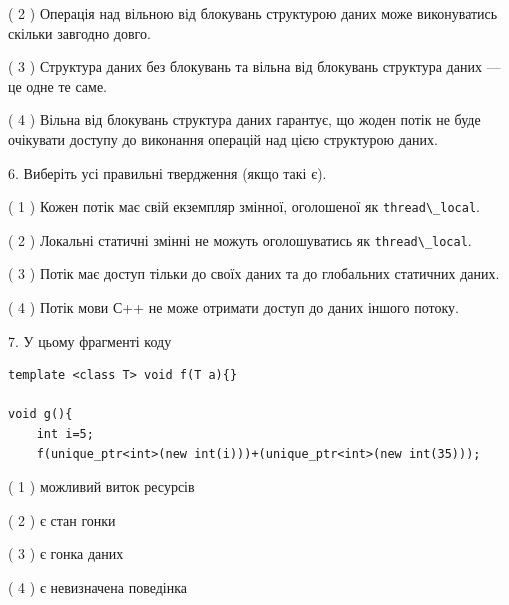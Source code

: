 \documentclass[12pt, ukrainian]{article}
\def\code#1{\Verb!#1!}
\begin{document}
\begin {large}
{( 2 ) Операція над вільною від блокувань структурою даних може виконуватись скільки завгодно довго.%

( 3 ) Структура даних без блокувань та вільна від блокувань структура даних --- це одне те саме.%

( 4 ) Вільна від блокувань структура даних гарантує, що жоден потік не буде очікувати доступу до виконання операцій над цією структурою даних.%
\newpage



\vspace{5mm}
6. Виберіть усі правильні твердження (якщо такі є).\par
\vspace{2mm}

( 1 ) Кожен потік має свій екземпляр змінної, оголошеної як \code{thread\_local}.%

( 2 ) Локальні статичні змінні не можуть оголошуватись як \code{thread\_local}.%

( 3 ) Потік має доступ тільки до своїх даних та до глобальних статичних даних.%

( 4 ) Потік мови С++ не може отримати доступ до даних іншого потоку.%


\vspace{5mm}
7. У цьому фрагменті коду
\begin{verbatim}
template <class T> void f(T a){}

void g(){
    int i=5;
    f(unique_ptr<int>(new int(i)))+(unique_ptr<int>(new int(35)));
\end{verbatim}
( 1 ) можливий виток ресурсів%

( 2 ) є стан гонки%

( 3 ) є гонка даних%

( 4 ) є невизначена поведінка%
}
\end {large}
\end{document}
